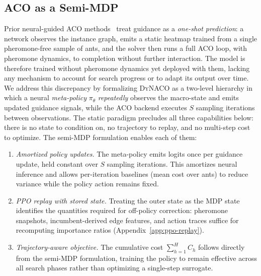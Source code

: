 \documentclass[sigconf,review]{acmart}
\newcommand{\DyNACO}{\textsc{DyNACO}}
\begin{document}
\subsection{ACO as a Semi-MDP}
\label{sec:mdp}

Prior neural-guided ACO methods~\cite{deepaco,gfacs,gtgaco} treat guidance as a \emph{one-shot prediction}: a network observes the instance graph, emits a static heatmap trained from a single pheromone-free sample of ants, and the solver then runs a full ACO loop, with pheromone dynamics, to completion without further interaction.
The model is therefore trained without pheromone dynamics yet deployed with them, lacking any mechanism to account for search progress or to adapt its output over time.
We address this discrepancy by formalizing \DyNACO{} as a two-level hierarchy in which a neural \emph{meta-policy} $\pi_\theta$ \emph{repeatedly} observes the macro-state and emits updated guidance signals, while the ACO backend executes $S$ sampling iterations between observations.
The static paradigm precludes all three capabilities below: there is no state to condition on, no trajectory to replay, and no multi-step cost to optimize.  The semi-MDP formulation enables each of them:

\begin{enumerate}
\item \emph{Amortized policy updates.} The meta-policy emits logits once per guidance update, held constant over $S$ sampling iterations. This amortizes neural inference and allows per-iteration baselines (mean cost over ants) to reduce variance while the policy action remains fixed.
\item \emph{PPO replay with stored state.} Treating the outer state as the MDP state identifies the quantities required for off-policy correction: pheromone snapshots, incumbent-derived edge features, and action traces suffice for recomputing importance ratios (Appendix~\ref{app:ppo-replay}).
\item \emph{Trajectory-aware objective.} The cumulative cost $\sum_{h=1}^H C_h$ follows directly from the semi-MDP formulation, training the policy to remain effective across all search phases rather than optimizing a single-step surrogate.
\end{enumerate}
\end{document}
